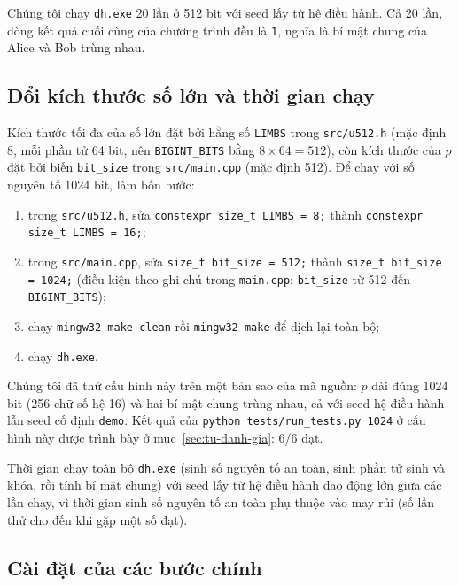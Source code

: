 Chúng tôi chạy \texttt{dh.exe} 20 lần ở 512 bit với seed lấy từ hệ điều hành. Cả 20
lần, dòng kết quả cuối cùng của chương trình đều là \texttt{1}, nghĩa là bí mật
chung của Alice và Bob trùng nhau.

\subsection{Đổi kích thước số lớn và thời gian chạy}

Kích thước tối đa của số lớn đặt bởi hằng số \texttt{LIMBS} trong \texttt{src/u512.h}
(mặc định 8, mỗi phần tử 64 bit, nên \texttt{BIGINT\_BITS} bằng $8 \times 64 = 512$),
còn kích thước của $p$ đặt bởi biến \texttt{bit\_size} trong \texttt{src/main.cpp}
(mặc định 512). Để chạy với số nguyên tố 1024 bit, làm bốn bước:
\begin{enumerate}
  \item trong \texttt{src/u512.h}, sửa \texttt{constexpr size\_t LIMBS = 8;} thành
        \texttt{constexpr size\_t LIMBS = 16;};
  \item trong \texttt{src/main.cpp}, sửa \texttt{size\_t bit\_size = 512;} thành
        \texttt{size\_t bit\_size = 1024;} (điều kiện theo ghi chú trong \texttt{main.cpp}: \texttt{bit\_size} từ 512 đến
        \texttt{BIGINT\_BITS});
  \item chạy \texttt{mingw32-make clean} rồi \texttt{mingw32-make} để dịch lại
        toàn bộ;
  \item chạy \texttt{dh.exe}.
\end{enumerate}
Chúng tôi đã thử cấu hình này trên một bản sao của mã nguồn: $p$ dài đúng 1024 bit
(256 chữ số hệ 16) và hai bí mật chung trùng nhau, cả với seed hệ điều hành lẫn
seed cố định \texttt{demo}. Kết quả của \texttt{python tests/run\_tests.py 1024} ở cấu hình này được trình bày ở mục~\ref{sec:tu-danh-gia}: 6/6 đạt.

Thời gian chạy toàn bộ \texttt{dh.exe} (sinh số nguyên tố an toàn, sinh phần tử sinh và khóa, rồi tính bí mật chung) với seed lấy từ hệ điều hành dao động lớn giữa các lần chạy, vì thời gian sinh số nguyên tố an toàn phụ thuộc vào may rủi (số lần thử cho đến khi gặp một số đạt).

\subsection{Cài đặt của các bước chính}

